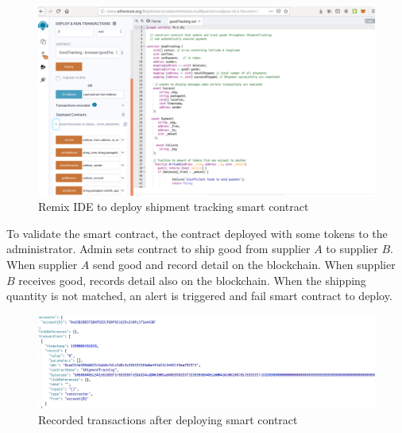 \begin{center}
	
	\begin{figure}[htb!]
		
		\begin{minipage}{0.55\linewidth}
			\centering
			\includegraphics[width=1.55\textwidth]{images/chap03_remix.png}
		\end{minipage}
		\caption{Remix IDE to deploy shipment tracking smart contract}
		
	\end{figure}
	
\end{center}

To validate the smart contract, the contract deployed with some tokens to the administrator. Admin sets contract to ship good from supplier $A$ to supplier $B$. When supplier $A$ send good and record detail on the blockchain. When supplier $B$ receives good, records detail also on the blockchain. When the shipping quantity is not matched, an alert is triggered and fail smart contract to deploy.

\begin{center}
	
	\begin{figure}[htb!]
		
		\begin{minipage}{0.55\linewidth}
			\centering
			\includegraphics[width=1.55\textwidth]{images/chap03_ABI.png}
		\end{minipage}
		\caption{Recorded transactions after deploying smart contract}
		
	\end{figure}
	
\end{center}


